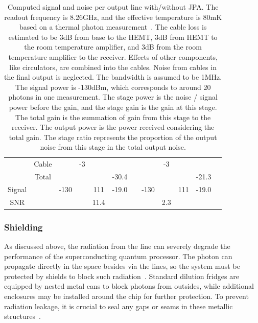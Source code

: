 \documentclass[a4paper,onecolumn,11pt,unpublished]{quantumarticle}
\begin{document}
\begin{table}
\begin{tabular}{cc|ccccc|ccccc}
                           & Cable           &                               & -3                         &      &       &      &      & -3  &     &       &      \\
                           & Total           &                               &                            &      & -30.4 &      &      &     &     & -21.3 &      \\
    Signal                 &                 & -130                          &                            & 111  & -19.0 &      & -130 &     & 111 & -19.0 &      \\
    SNR                    &                 &                               &                            & 11.4 &       &      &      & 2.3 &                    \\
    \hline \hline
  \end{tabular}
  \caption{Computed signal and noise per output line with/without JPA. The readout frequency is 8.26GHz, and the effective temperature is 80mK based on a thermal photon measurement~\cite{Yan2018Distinguishing}. The cable loss is estimated to be 3dB from base to the HEMT, 3dB from HEMT to the room temperature amplifier, and 3dB from the room temperature amplifier to the receiver. Effects of other components, like circulators, are combined into the cables. Noise from cables in the final output is neglected. The bandwidth is assumed to be 1MHz. The signal power is -130dBm, which corresponds to around 20 photons in one measurement. The stage power is the noise / signal power before the gain, and the stage gain is the gain at this stage. The total gain is the summation of gain from this stage to the receiver. The output power is the power received considering the total gain. The stage ratio represents the proportion of the output noise from this stage in the total output noise. }
  \label{table:cryo_output_line_detail}
\end{table}


\subsubsection{Shielding\label{subsec:shielding}}
As discussed above, the radiation from the line can severely degrade the performance of the superconducting quantum processor. The photon can propagate directly in the space besides via the lines, so the system must be protected by shields to block such radiation~\cite{Corcoles2011Protecting}. Standard dilution fridges are equipped by nested metal cans to block photons from outsides, while additional enclosures may be installed around the chip for further protection. To prevent radiation leakage, it is crucial to seal any gaps or seams in these metallic structures~\cite{Geerlings2013Improving,Nguyen2020Toward}.
\end{document}
